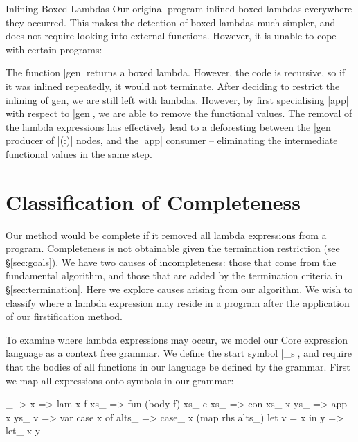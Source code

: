 \documentclass[preprint]{sigplanconf}
\begin{document}
\begin{examplename}{Inlining Boxed Lambdas}
\label{ex:inlining_boxed_lambdas}
Our original program inlined boxed lambdas everywhere they occurred. This makes the detection of boxed lambdas much simpler, and does not require looking into external functions. However, it is unable to cope with certain programs:


The function |gen| returns a boxed lambda. However, the code is recursive, so if it was inlined repeatedly, it would not terminate. After deciding to restrict the inlining of gen, we are still left with lambdas. However, by first specialising |app| with respect to |gen|, we are able to remove the functional values. The removal of the lambda expressions has effectively lead to a deforesting between the |gen| producer of |(:)| nodes, and the |app| consumer -- eliminating the intermediate functional values in the same step.
\end{examplename}



\section{Classification of Completeness}
\label{sec:completeness}

Our method would be complete if it removed all lambda expressions from a program. Completeness is not obtainable given the termination restriction (see \S\ref{sec:goals}). We have two causes of incompleteness: those that come from the fundamental algorithm, and those that are added by the termination criteria in \S\ref{sec:termination}. Here we explore causes arising from our algorithm. We wish to classify where a lambda expression may reside in a program after the application of our firstification method.

To examine where lambda expressions may occur, we model our Core expression language as a context free grammar. We define the start symbol |_s|, and require that the bodies of all functions in our language be defined by the grammar. First we map all expressions onto symbols in our grammar:

\begin{code}
\vs_ -> x         => lam x
f xs_             => fun (body f) xs_
c xs_             => con xs_
x ys_             => app x ys_
v                 => var
case x of alts_   => case_ x (map rhs alts_)
let v = x in y    => let_ x y
\end{code}
\end{document}
